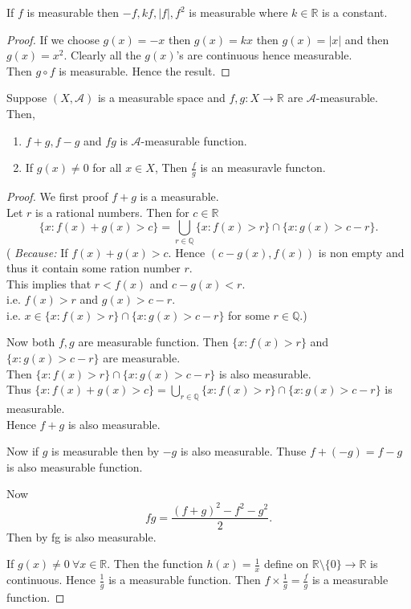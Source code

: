 \begin{corollary}
    \label{-f}
    If $f$ is measurable then  $-f,kf,|f|,f^{2}$ is measurable where $k\in\mathds{R}$ is a constant.
\end{corollary}
\begin{proof}
    If we choose $g(x)=-x$ then $g(x)=kx$ then $g(x)=|x|$ and then $g(x)=x^{2}$. Clearly all the $g(x)$'s are continuous hence measurable.\\
    Then  $g\circ f$ is measurable. Hence the result.
\end{proof}

\begin{theorem}[]
    \label{f+g}
    Suppose $(X,\mathcal{A})$ is a measurable space and $f,g:X\to\mathds{R}$ are $\mathcal{A}$-measurable.\\
    Then,
    \begin{enumerate}
        \item $f+g,f-g$ and $fg$ is  $\mathcal{A}$-measurable function.
        \item If $g(x)\neq 0$ for all  $x\in X$, Then  $\frac{f}{g}$ is an measuravle functon.
    \end{enumerate}
\end{theorem}
\begin{proof}
    We first proof $f+g$ is a measurable.\\
    Let  $r$ is a rational numbers. Then for $c\in\mathds{R}$
    \begin{equation}
        \{x:f(x)+g(x)>c\}=\bigcup_{r\in\mathds{Q}}\{x:f(x)>r\}\cap\{x:g(x)>c-r\}.
    \end{equation}
    ( \textit{Because:} If $f(x)+g(x)>c$. Hence  $(c-g(x),f(x))$ is non empty and thus it contain some ration number  $r$.\\
    This implies that $r<f(x)$ and  $c-g(x)<r$.\\
    i.e.  $f(x)>r$ and  $g(x)>c-r$.\\
    i.e.  $x \in \{x:f(x)>r\}\cap\{x:g(x)>c-r\}$ for some  $r\in\mathds{Q}$.)

    Now both $f,g$ are measurable function. Then $\{x:f(x)>r\}$ and $\{x:g(x)>c-r\}$ are measurable.\\
    Then $\{x:f(x)>r\}\cap\{x:g(x)>c-r\}$ is also measurable.\\
    Thus $\{x:f(x)+g(x)>c\}=\bigcup_{r\in\mathds{Q}}\{x:f(x)>r\}\cap\{x:g(x)>c-r\}$ is measurable.\\
    Hence $f+g$ is also measurable.

    Now if $g$ is measurable then by  $-g$ is also measurable. Thuse  $f+(-g)=f-g$ is also measurable function.

    Now 
    \[
        fg=\frac{(f+g)^{2}-f^2-g^2}{2}.
    \]
    Then by  fg is also measurable.

    If $g(x)\neq 0\ \forall x\in \mathds{R}$. Then the function $h(x)=\frac{1}{x}$ define on  $\mathds{R}\setminus\{0\}\to\mathds{R}$ is continuous.
    Hence $\frac{1}{g}$ is a measurable function. Then  $f\times\frac{1}{g}=\frac{f}{g}$ is a measurable function.
\end{proof}

